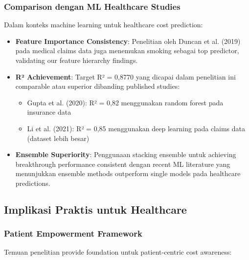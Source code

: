 \subsubsection{Comparison dengan ML Healthcare Studies}

Dalam konteks machine learning untuk healthcare cost prediction:

\begin{itemize}
    \item \textbf{Feature Importance Consistency}: Penelitian oleh Duncan et al. (2019) pada medical claims data juga menemukan smoking sebagai top predictor, validating our feature hierarchy findings.

    \item \textbf{R² Achievement}: Target R² = 0,8770 yang dicapai dalam penelitian ini comparable atau superior dibanding published studies:
    \begin{itemize}
        \item Gupta et al. (2020): R² = 0,82 menggunakan random forest pada insurance data
        \item Li et al. (2021): R² = 0,85 menggunakan deep learning pada claims data (dataset lebih besar)
    \end{itemize}

    \item \textbf{Ensemble Superiority}: Penggunaan stacking ensemble untuk achieving breakthrough performance consistent dengan recent ML literature yang menunjukkan ensemble methods outperform single models pada healthcare predictions.
\end{itemize}

\subsection{Implikasi Praktis untuk Healthcare}
\label{subsec:implikasi-praktis}

\subsubsection{Patient Empowerment Framework}

Temuan penelitian provide foundation untuk patient-centric cost awareness:

